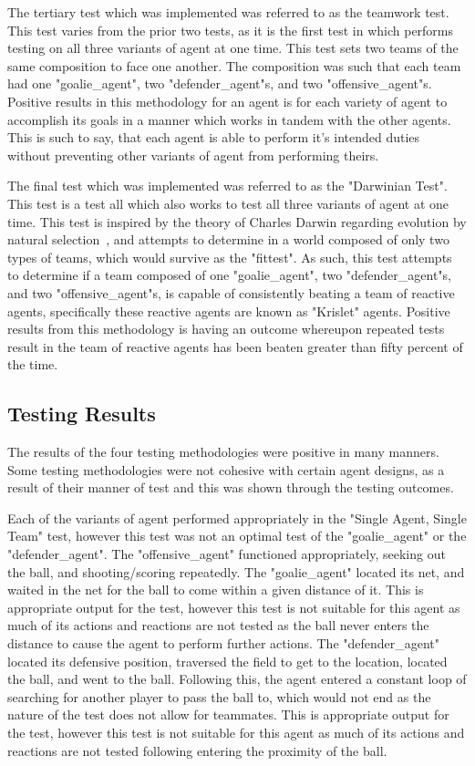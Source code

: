 \documentclass[conference]{IEEEtran}
\begin{document}
The tertiary test which was implemented was referred to as the teamwork test.
This test varies from the prior two tests, as it is the first test in which performs testing on all three variants of agent at one time.
This test sets two teams of the same composition to face one another.
The composition was such that each team had one "goalie\_agent", two "defender\_agent"s, and two "offensive\_agent"s.
Positive results in this methodology for an agent is for each variety of agent to accomplish its goals in a manner which works in tandem with the other agents.
This is such to say, that each agent is able to perform it's intended duties without preventing other variants of agent from performing theirs.

The final test which was implemented was referred to as the "Darwinian Test".
This test is a test all which also works to test all three variants of agent at one time.
This test is inspired by the theory of Charles Darwin regarding evolution by natural selection~\cite{b2}, and attempts to determine in a world composed of only two types of teams, which would survive as the "fittest".
As such, this test attempts to determine if a team composed of one "goalie\_agent", two "defender\_agent"s, and two "offensive\_agent"s, is capable of consistently beating a team of reactive agents, specifically these reactive agents are known as "Krislet" agents.
Positive results from this methodology is having an outcome whereupon repeated tests result in the team of reactive agents has been beaten greater than fifty percent of the time.

\subsection{Testing Results}

The results of the four testing methodologies were positive in many manners.
Some testing methodologies were not cohesive with certain agent designs, as a result of their manner of test and this was shown through the testing outcomes.

Each of the variants of agent performed appropriately in the "Single Agent, Single Team" test, however this test was not an optimal test of the "goalie\_agent" or the "defender\_agent".
The "offensive\_agent" functioned appropriately, seeking out the ball, and shooting/scoring repeatedly.
The "goalie\_agent" located its net, and waited in the net for the ball to come within a given distance of it.
This is appropriate output for the test, however this test is not suitable for this agent as much of its actions and reactions are not tested as the ball never enters the distance to cause the agent to perform further actions.
The "defender\_agent" located its defensive position, traversed the field to get to the location, located the ball, and went to the ball.
Following this, the agent entered a constant loop of searching for another player to pass the ball to, which would not end as the nature of the test does not allow for teammates.
This is appropriate output for the test, however this test is not suitable for this agent as much of its actions and reactions are not tested following entering the proximity of the ball.
\end{document}
